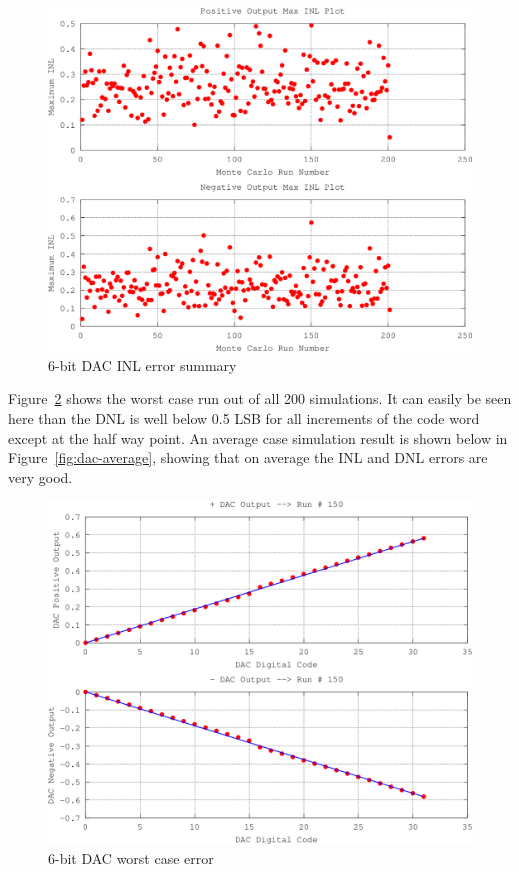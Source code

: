 \documentclass[12pt,oneside,final]{siuethesis}
\theoremstyle{definition}
\begin{document}
\begin{figure}[htbp!]
 \centering
 \includegraphics[scale=.31]{./ch4_figures/inl_summary.png}
 \caption{6-bit DAC INL error summary}
 \label{fig:inl}
\end{figure} 

\par Figure~\ref{fig:dac-worst} shows the worst case run out of all 200 simulations. It can easily be seen here than the DNL is well below 0.5 LSB for all increments of the code word except at the half way point. An average case simulation result is shown below in Figure~\ref{fig:dac-average}, showing that on average the INL and DNL errors are very good.
\begin{figure}[htbp!]
 \centering
 \includegraphics[scale=.3]{./ch4_figures/dnl_worst.png}
 \caption{6-bit DAC worst case error}
 \label{fig:dac-worst}
\end{figure} 
\end{document}
